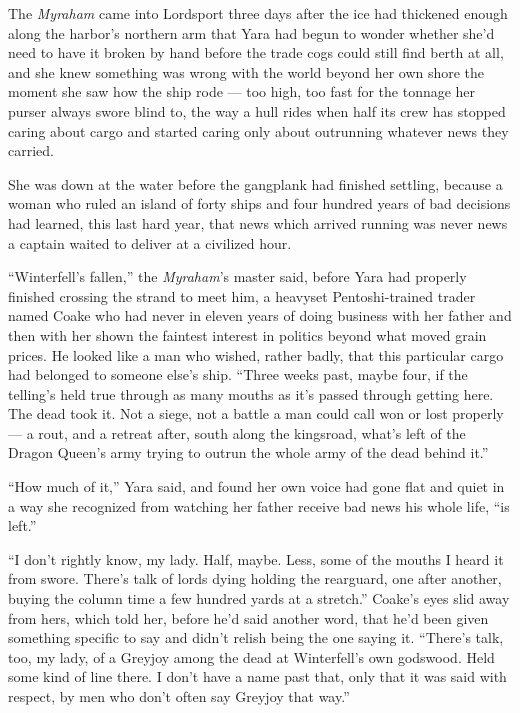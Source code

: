 The \textit{Myraham} came into Lordsport three days after the ice had thickened enough along the harbor’s northern arm that Yara had begun to wonder whether she’d need to have it broken by hand before the trade cogs could still find berth at all, and she knew something was wrong with the world beyond her own shore the moment she saw how the ship rode — too high, too fast for the tonnage her purser always swore blind to, the way a hull rides when half its crew has stopped caring about cargo and started caring only about outrunning whatever news they carried.

She was down at the water before the gangplank had finished settling, because a woman who ruled an island of forty ships and four hundred years of bad decisions had learned, this last hard year, that news which arrived running was never news a captain waited to deliver at a civilized hour.

“Winterfell’s fallen,” the \textit{Myraham}’s master said, before Yara had properly finished crossing the strand to meet him, a heavyset Pentoshi-trained trader named Coake who had never in eleven years of doing business with her father and then with her shown the faintest interest in politics beyond what moved grain prices. He looked like a man who wished, rather badly, that this particular cargo had belonged to someone else’s ship. “Three weeks past, maybe four, if the telling’s held true through as many mouths as it’s passed through getting here. The dead took it. Not a siege, not a battle a man could call won or lost properly — a rout, and a retreat after, south along the kingsroad, what’s left of the Dragon Queen’s army trying to outrun the whole army of the dead behind it.”

“How much of it,” Yara said, and found her own voice had gone flat and quiet in a way she recognized from watching her father receive bad news his whole life, “is left.”

“I don’t rightly know, my lady. Half, maybe. Less, some of the mouths I heard it from swore. There’s talk of lords dying holding the rearguard, one after another, buying the column time a few hundred yards at a stretch.” Coake’s eyes slid away from hers, which told her, before he’d said another word, that he’d been given something specific to say and didn’t relish being the one saying it. “There’s talk, too, my lady, of a Greyjoy among the dead at Winterfell’s own godswood. Held some kind of line there. I don’t have a name past that, only that it was said with respect, by men who don’t often say Greyjoy that way.”

